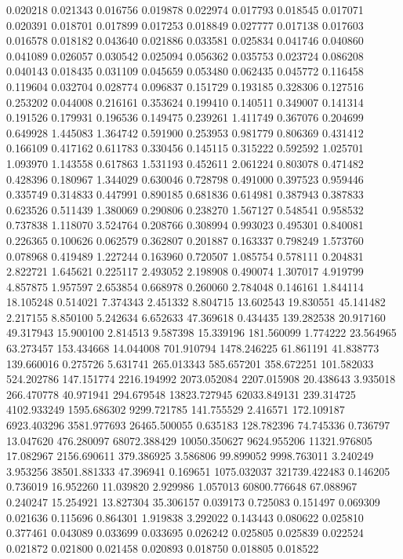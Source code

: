 0.020218
0.021343
0.016756
0.019878
0.022974
0.017793
0.018545
0.017071
0.020391
0.018701
0.017899
0.017253
0.018849
0.027777
0.017138
0.017603
0.016578
0.018182
0.043640
0.021886
0.033581
0.025834
0.041746
0.040860
0.041089
0.026057
0.030542
0.025094
0.056362
0.035753
0.023724
0.086208
0.040143
0.018435
0.031109
0.045659
0.053480
0.062435
0.045772
0.116458
0.119604
0.032704
0.028774
0.096837
0.151729
0.193185
0.328306
0.127516
0.253202
0.044008
0.216161
0.353624
0.199410
0.140511
0.349007
0.141314
0.191526
0.179931
0.196536
0.149475
0.239261
1.411749
0.367076
0.204699
0.649928
1.445083
1.364742
0.591900
0.253953
0.981779
0.806369
0.431412
0.166109
0.417162
0.611783
0.330456
0.145115
0.315222
0.592592
1.025701
1.093970
1.143558
0.617863
1.531193
0.452611
2.061224
0.803078
0.471482
0.428396
0.180967
1.344029
0.630046
0.728798
0.491000
0.397523
0.959446
0.335749
0.314833
0.447991
0.890185
0.681836
0.614981
0.387943
0.387833
0.623526
0.511439
1.380069
0.290806
0.238270
1.567127
0.548541
0.958532
0.737838
1.118070
3.524764
0.208766
0.308994
0.993023
0.495301
0.840081
0.226365
0.100626
0.062579
0.362807
0.201887
0.163337
0.798249
1.573760
0.078968
0.419489
1.227244
0.163960
0.720507
1.085754
0.578111
0.204831
2.822721
1.645621
0.225117
2.493052
2.198908
0.490074
1.307017
4.919799
4.857875
1.957597
2.653854
0.668978
0.260060
2.784048
0.146161
1.844114
18.105248
0.514021
7.374343
2.451332
8.804715
13.602543
19.830551
45.141482
2.217155
8.850100
5.242634
6.652633
47.369618
0.434435
139.282538
20.917160
49.317943
15.900100
2.814513
9.587398
15.339196
181.560099
1.774222
23.564965
63.273457
153.434668
14.044008
701.910794
1478.246225
61.861191
41.838773
139.660016
0.275726
5.631741
265.013343
585.657201
358.672251
101.582033
524.202786
147.151774
2216.194992
2073.052084
2207.015908
20.438643
3.935018
266.470778
40.971941
294.679548
13823.727945
62033.849131
239.314725
4102.933249
1595.686302
9299.721785
141.755529
2.416571
172.109187
6923.403296
3581.977693
26465.500055
0.635183
128.782396
74.745336
0.736797
13.047620
476.280097
68072.388429
10050.350627
9624.955206
11321.976805
17.082967
2156.690611
379.386925
3.586806
99.899052
9998.763011
3.240249
3.953256
38501.881333
47.396941
0.169651
1075.032037
321739.422483
0.146205
0.736019
16.952260
11.039820
2.929986
1.057013
60800.776648
67.088967
0.240247
15.254921
13.827304
35.306157
0.039173
0.725083
0.151497
0.069309
0.021636
0.115696
0.864301
1.919838
3.292022
0.143443
0.080622
0.025810
0.377461
0.043089
0.033699
0.033695
0.026242
0.025805
0.025839
0.022524
0.021872
0.021800
0.021458
0.020893
0.018750
0.018805
0.018522

